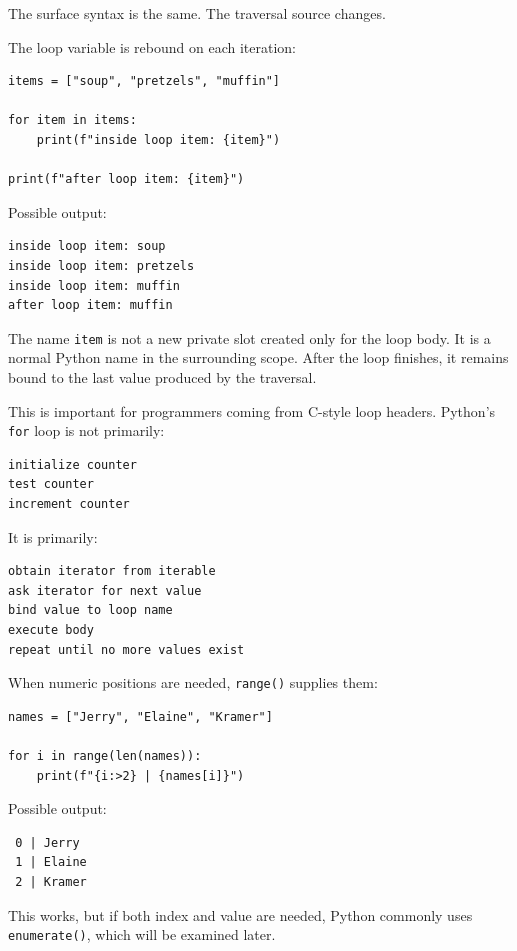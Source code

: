The surface syntax is the same. The traversal source changes.

The loop variable is rebound on each iteration:

\begin{verbatim}
items = ["soup", "pretzels", "muffin"]

for item in items:
    print(f"inside loop item: {item}")

print(f"after loop item: {item}")
\end{verbatim}

Possible output:

\begin{verbatim}
inside loop item: soup
inside loop item: pretzels
inside loop item: muffin
after loop item: muffin
\end{verbatim}

The name \texttt{item} is not a new private slot created only for the loop body. It is a normal Python name in the surrounding scope. After the loop finishes, it remains bound to the last value produced by the traversal.

This is important for programmers coming from C-style loop headers. Python's \texttt{for} loop is not primarily:

\begin{verbatim}
initialize counter
test counter
increment counter
\end{verbatim}

It is primarily:

\begin{verbatim}
obtain iterator from iterable
ask iterator for next value
bind value to loop name
execute body
repeat until no more values exist
\end{verbatim}

When numeric positions are needed, \texttt{range()} supplies them:

\begin{verbatim}
names = ["Jerry", "Elaine", "Kramer"]

for i in range(len(names)):
    print(f"{i:>2} | {names[i]}")
\end{verbatim}

Possible output:

\begin{verbatim}
 0 | Jerry
 1 | Elaine
 2 | Kramer
\end{verbatim}

This works, but if both index and value are needed, Python commonly uses \texttt{enumerate()}, which will be examined later.

